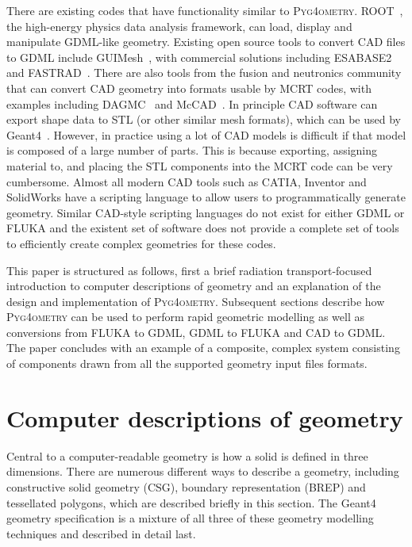 \documentclass[preprint,12pt]{elsarticle}
\newcommand{\PYGEOMETRY}{\textsc{Pyg4ometry}}
\begin{document}
There are existing codes that have functionality similar to \PYGEOMETRY{}. ROOT~\cite{Brun:1997pa}, the high-energy physics data analysis framework,
can load, display and manipulate GDML-like geometry. Existing open source tools to convert CAD files to GDML include GUIMesh~\cite{GUIMesh_Pinto}, with commercial
solutions including ESABASE2~\cite{ESABASE2} and FASTRAD~\cite{FASTRAD}. There are also tools from the fusion and neutronics community that can convert CAD
geometry into formats usable by MCRT codes, with examples including DAGMC~\cite{DAGMC} and McCAD~\cite{McCad}. In principle CAD software can export shape data to STL
(or other similar mesh formats), which can be used by Geant4~\cite{poole2012acad}. However, in practice using a lot of CAD models is difficult if that model is composed of a
large number of parts. This is because exporting, assigning material to, and placing the STL components into the MCRT code can be very cumbersome. Almost all modern CAD tools such as
CATIA, Inventor and SolidWorks have a scripting language to allow users to programmatically generate geometry. Similar CAD-style scripting languages do not exist for either GDML
or FLUKA and the existent set of software does not provide a complete set of tools to efficiently create complex geometries for these codes.

This paper is structured as follows, first a brief radiation
transport-focused introduction to computer descriptions of geometry and an explanation of the design
and implementation of \PYGEOMETRY{}. Subsequent sections describe how \PYGEOMETRY{} can be used to perform rapid geometric modelling as well as conversions from
FLUKA to GDML, GDML to FLUKA and CAD to GDML. The paper concludes with an example of a composite, complex system consisting of components drawn from
all the supported  geometry input files formats.

\section{Computer descriptions of geometry} \label{sec:geometric}
Central to a computer-readable geometry is how a solid is defined in three dimensions. There are numerous different ways to describe a
geometry, including constructive solid geometry (CSG), boundary representation (BREP) and tessellated polygons, which are described
briefly in this section.  The Geant4 geometry specification is a mixture of all three of these geometry modelling techniques and described in detail last.
\end{document}
